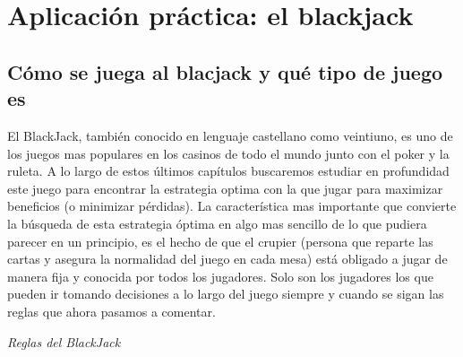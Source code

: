 \documentclass[12pt,a4paper,]{book}
\def\ifdoblecara{} %
\def\ifprincipal{} %
\numberwithin{dummy}{section}
\theoremstyle{ocrenumbox}
\theoremstyle{blacknumex}
\theoremstyle{blacknumbox}
\theoremstyle{ocrenum}
\theoremstyle{ocrenum}
\begin{document}
\FloatBarrier

\ifdefined\ifprincipal
\else
\setlength{\parindent}{1em}
\pagestyle{fancy}
\setcounter{tocdepth}{4}
\tableofcontents

\fi

\ifdefined\ifdoblecara
\fancyhead{}{}
\fancyhead[LE,RO]{\scriptsize\rightmark}
\fancyfoot[LO,RE]{\scriptsize\slshape \leftmark}
\fancyfoot[C]{}
\fancyfoot[LE,RO]{\footnotesize\thepage}
\else
\fancyhead{}{}
\fancyhead[RO]{\scriptsize\rightmark}
\fancyfoot[LO]{\scriptsize\slshape \leftmark}
\fancyfoot[C]{}
\fancyfoot[RO]{\footnotesize\thepage}
\fi

\renewcommand{\headrulewidth}{0.4pt}
\renewcommand{\footrulewidth}{0.4pt}

\hypertarget{Seccion3}{%
\chapter{Aplicación práctica: el blackjack}\label{Seccion3}}

\hypertarget{Seccion31}{%
\section{Cómo se juega al blacjack y qué tipo de juego
es}\label{Seccion31}}

El BlackJack, también conocido en lenguaje castellano como veintiuno, es
uno de los juegos mas populares en los casinos de todo el mundo junto
con el poker y la ruleta. A lo largo de estos últimos capítulos
buscaremos estudiar en profundidad este juego para encontrar la
estrategia optima con la que jugar para maximizar beneficios (o
minimizar pérdidas). La característica mas importante que convierte la
búsqueda de esta estrategia óptima en algo mas sencillo de lo que
pudiera parecer en un principio, es el hecho de que el crupier (persona
que reparte las cartas y asegura la normalidad del juego en cada mesa)
está obligado a jugar de manera fija y conocida por todos los jugadores.
Solo son los jugadores los que pueden ir tomando decisiones a lo largo
del juego siempre y cuando se sigan las reglas que ahora pasamos a
comentar.

\emph{Reglas del BlackJack}
\end{document}
